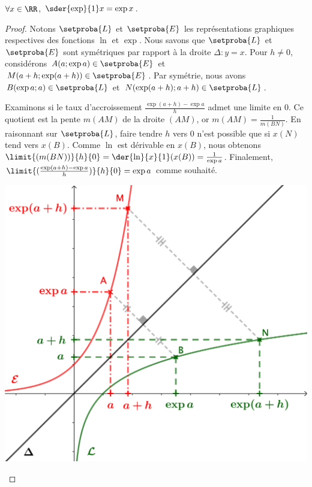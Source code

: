 \begin{fact}
	$\forall x \in \RR$,
	$\sder{\exp}{1} x = \exp x$.
\end{fact}


\begin{proof}
	Notons $\setproba{L}$ et $\setproba{E}$ les représentations graphiques respectives des fonctions $\ln$ et $\exp$.
	Nous savons que $\setproba{L}$ et $\setproba{E}$ sont symétriques par rapport à la droite $\Delta: y = x$.
	Pour $h \neq 0$, considérons 
	$A(a ; \exp a) \in \setproba{E}$ et $M(a+h ; \exp(a+h)) \in \setproba{E}$.
	Par symétrie, nous avons
	$B(\exp a ; a) \in \setproba{L}$ et $N(\exp(a+h) ; a+h) \in \setproba{L}$.
	
	Examinons si le taux d'accroissement $\frac{\exp(a+h) - \exp a}{h}$ admet une limite en $0$.
	Ce quotient est la pente $m(AM)$ de la droite $(AM)$,
	or $m(AM) = \frac{1}{m(BN)}$.
	En raisonnant sur $\setproba{L}$, faire tendre $h$ vers $0$ n'est possible que si $x(N)$ tend vers $x(B)$.
	Comme $\ln$ est dérivable en $x(B)$, nous obtenons $\limit{(m(BN))}{h}{0} = \der{\ln}{x}{1}(x(B)) = \frac{1}{\exp a}$.
	Finalement,
	$\limit{(\frac{\exp(a+h) - \exp a}{h})}{h}{0} = \exp a$
	comme souhaité.

	\begin{center}
		\includegraphics[scale=.85]{content/exp/eq-diff.png}
	\end{center}
\end{proof}